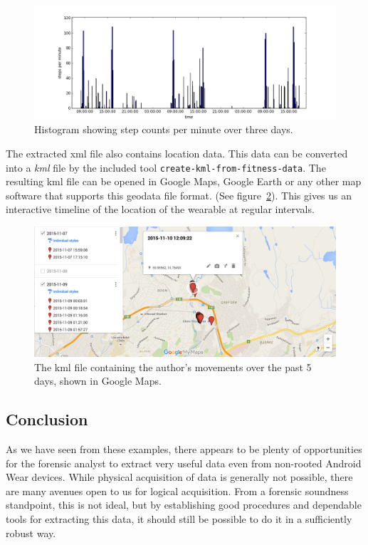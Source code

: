 \documentclass[a4paper,11pt,dvips]{article}
\begin{document}
\begin{figure}
\noindent
\includegraphics[natwidth=1355bp,natheight=512bp,width=\linewidth]{stepcount}
\caption{Histogram showing step counts per minute over three days.}
\label{fig:stepcount}
\end{figure}

The extracted xml file also contains location data. This data can be converted into a \textit{kml} file by the included tool \texttt{create-kml-from-fitness-data}. The resulting kml file can be opened in Google Maps, Google Earth or any other map software that supports this geodata file format. (See figure~\ref{fig:geodata}). This gives us an interactive timeline of the location of the wearable at regular intervals.

\begin{figure}
\noindent
\includegraphics[natwidth=2096bp,natheight=906bp,width=\linewidth]{geodata}
\caption{The kml file containing the author's movements over the past 5 days, shown in Google Maps.}
\label{fig:geodata}
\end{figure}


\subsection{Conclusion}

As we have seen from these examples, there appears to be plenty of opportunities for the forensic analyst to extract very useful data even from non-rooted Android Wear devices. While physical acquisition of data is generally not possible, there are many avenues open to us for logical acquisition. From a forensic soundness standpoint, this is not ideal, but by establishing good procedures and dependable tools for extracting this data, it should still be possible to do it in a sufficiently robust way.
\end{document}

